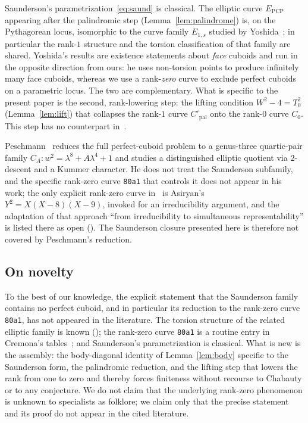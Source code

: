 \documentclass[11pt,reqno]{amsart}
\theoremstyle{plain}
\theoremstyle{definition}
\begin{document}
Saunderson's parametrization~\eqref{eq:saund} is classical. The elliptic curve
$E_{\mathrm{PCP}}$ appearing after the palindromic step
(Lemma~\ref{lem:palindrome}) is, on the Pythagorean locus, isomorphic to the
curve family $E_{1,s}$ studied by Yoshida~\cite{yoshida}; in particular the
rank-$1$ structure and the torsion classification of that family are shared.
Yoshida's results are existence statements about \emph{face} cuboids and run in
the opposite direction from ours: he uses non-torsion points to produce
infinitely many face cuboids, whereas we use a rank-\emph{zero} curve to
exclude perfect cuboids on a parametric locus. The two are complementary.
What is specific to the present paper is the second, rank-lowering step: the
lifting condition $W^2-4=T_0^2$ (Lemma~\ref{lem:lift}) that collapses the
rank-$1$ curve $C'_{\mathrm{pal}}$ onto the rank-$0$ curve $C_0$. This step has
no counterpart in~\cite{yoshida}.

Peschmann~\cite{peschmann} reduces the full perfect-cuboid problem to a
genus-three quartic-pair family $C_A:w^2=\lambda^8+A\lambda^4+1$ and studies a
distinguished elliptic quotient via $2$-descent and a Kummer character. He does
not treat the Saunderson subfamily, and the specific rank-zero curve
\texttt{80a1} that controls it does not appear in his work; the only explicit
rank-zero curve in~\cite{peschmann} is Asiryan's
$Y^2=X(X-8)(X-9)$, invoked for an irreducibility argument, and the adaptation
of that approach ``from irreducibility to simultaneous representability'' is
listed there as open (\cite[\S8]{peschmann}). The Saunderson closure presented
here is therefore not covered by Peschmann's reduction.

\subsection{On novelty}\label{sec:novelty}

To the best of our knowledge, the explicit statement that the Saunderson family
contains no perfect cuboid, and in particular its reduction to the rank-zero
curve \texttt{80a1}, has not appeared in the literature. The torsion structure
of the related elliptic family is known
(\cite{yoshida}); the rank-zero curve \texttt{80a1} is a routine entry in
Cremona's tables~\cite{cremona}; and Saunderson's parametrization is classical.
What is new is the assembly: the body-diagonal identity of Lemma~\ref{lem:body}
specific to the Saunderson form, the palindromic reduction, and the lifting
step that lowers the rank from one to zero and thereby forces finiteness
without recourse to Chabauty or to any conjecture. We do not claim that the
underlying rank-zero phenomenon is unknown to specialists as folklore; we claim
only that the precise statement and its proof do not appear in the cited
literature.
\end{document}
